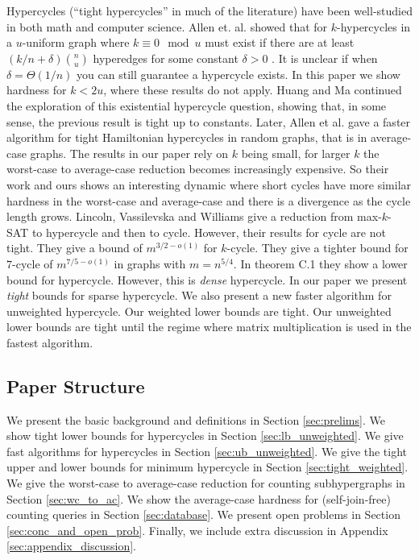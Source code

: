 \documentclass[11pt,letterpaper,pdftex]{article}
\newcounter{definition}
\begin{document}
Hypercycles (``tight hypercycles'' in much of the literature) have been well-studied in both math and computer science. 
Allen et. al. \cite{allen2015tight} showed that for $k$-hypercycles in a $u$-uniform graph where $k \equiv 0 \mod u$ must exist if there are at least $(k/n + \delta)\binom{n}{u}$ hyperedges for some constant $\delta>0$ . 
It is unclear if when $\delta = \Theta(1/n)$ you can still guarantee a hypercycle exists. In this paper we show hardness for $k < 2u$, where these results do not apply. 
Huang and Ma \cite{tightCyclesHypergraphsExistance} continued the exploration of this existential hypercycle question, showing that, in some sense, the previous result is tight up to constants. 
Later, Allen et al. \cite{AllenKPP18} gave a faster algorithm for tight Hamiltonian hypercycles in random graphs, that is in average-case graphs. 
The results in our paper rely on $k$ being small, for larger $k$ the worst-case to average-case reduction becomes increasingly expensive. 
So their work and ours shows an interesting dynamic where short cycles have more similar hardness in the worst-case and average-case and there is a divergence as the cycle length grows.
Lincoln, Vassilevska and Williams \cite{LVW18} give a reduction from max-$k$-SAT to hypercycle and then to cycle. 
However, their results for cycle are not tight. 
They give a bound of $m^{3/2-o(1)}$ for $k$-cycle. They give a tighter bound for $7$-cycle of $m^{7/5-o(1)}$ in graphs with $m = n^{5/4}$. 
In theorem C.1 they show a lower bound for hypercycle. 
However, this is \textit{dense} hypercycle. 
In our paper we present\textit{ tight} bounds for sparse hypercycle. 
We also present a new faster algorithm for unweighted hypercycle. 
Our weighted lower bounds are tight. 
Our unweighted lower bounds are tight until the regime where matrix multiplication is used in the fastest algorithm. 

\subsection{Paper Structure}

We present the basic background and definitions in Section \ref{sec:prelims}. 
We show tight lower bounds for hypercycles in Section \ref{sec:lb_unweighted}. 
We give fast algorithms for hypercycles in Section \ref{sec:ub_unweighted}. 
We give the tight upper and lower bounds for minimum hypercycle in Section \ref{sec:tight_weighted}. 
We give the worst-case to average-case reduction for counting subhypergraphs in Section \ref{sec:wc_to_ac}. 
We show the average-case hardness for (self-join-free) counting queries in Section \ref{sec:database}. 
We present open problems in Section \ref{sec:conc_and_open_prob}. 
Finally, we include extra discussion in Appendix \ref{sec:appendix_discussion}. 
\end{document}
